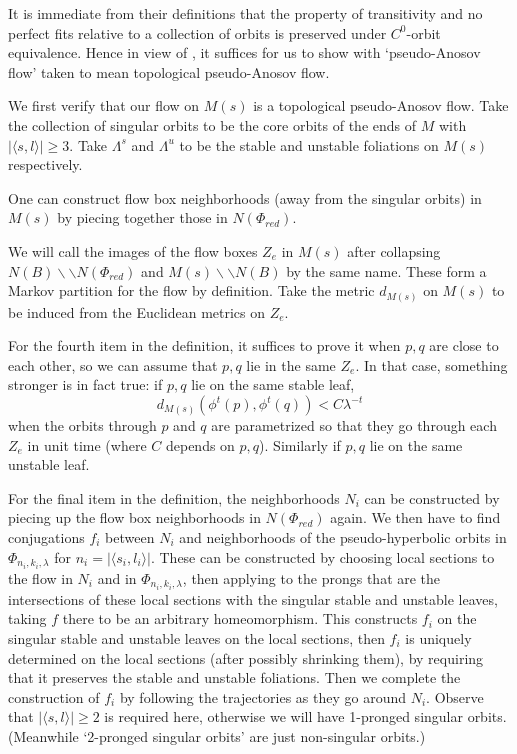 \documentclass[12pt]{amsart}
\theoremstyle{definition}
\numberwithin{equation}{section}
\begin{document}
It is immediate from their definitions that the property of transitivity and no perfect fits relative to a collection of orbits is preserved under $C^0$-orbit equivalence. Hence in view of , it suffices for us to show  with `pseudo-Anosov flow' taken to mean topological pseudo-Anosov flow.

We first verify that our flow on $M(s)$ is a topological pseudo-Anosov flow. Take the collection of singular orbits to be the core orbits of the ends of $M$ with $|\langle s,l \rangle| \geq 3$. Take $\Lambda^s$ and $\Lambda^u$ to be the stable and unstable foliations on $M(s)$ respectively.

One can construct flow box neighborhoods (away from the singular orbits) in $M(s)$ by piecing together those in $N(\Phi_{red})$.

We will call the images of the flow boxes $Z_e$ in $M(s)$ after collapsing $N(B) \backslash \backslash N(\Phi_{red})$ and $M(s) \backslash \backslash N(B)$ by the same name. These form a Markov partition for the flow by definition. Take the metric $d_{M(s)}$ on $M(s)$ to be induced from the Euclidean metrics on $Z_e$. 

For the fourth item in the definition, it suffices to prove it when $p,q$ are close to each other, so we can assume that $p,q$ lie in the same $Z_e$. In that case, something stronger is in fact true: if $p,q$ lie on the same stable leaf, $$d_{M(s)}(\phi^t(p),\phi^t(q))<C \lambda^{-t}$$ when the orbits through $p$ and $q$ are parametrized so that they go through each $Z_e$ in unit time (where $C$ depends on $p,q$). Similarly if $p,q$ lie on the same unstable leaf.

For the final item in the definition, the neighborhoods $N_i$ can be constructed by piecing up the flow box neighborhoods in $N(\Phi_{red})$ again. We then have to find conjugations $f_i$ between $N_i$ and neighborhoods of the pseudo-hyperbolic orbits in $\Phi_{n_i,k_i,\lambda}$ for $n_i=|\langle s_i,l_i \rangle|$. These can be constructed by choosing local sections to the flow in $N_i$ and in $\Phi_{n_i,k_i,\lambda}$, then applying  to the prongs that are the intersections of these local sections with the singular stable and unstable leaves, taking $f$ there to be an arbitrary homeomorphism. This constructs $f_i$ on the singular stable and unstable leaves on the local sections, then $f_i$ is uniquely determined on the local sections (after possibly shrinking them), by requiring that it preserves the stable and unstable foliations. Then we complete the construction of $f_i$ by following the trajectories as they go around $N_i$. Observe that $|\langle s, l \rangle| \geq 2$ is required here, otherwise we will have 1-pronged singular orbits. (Meanwhile `2-pronged singular orbits' are just non-singular orbits.)
\end{document}
